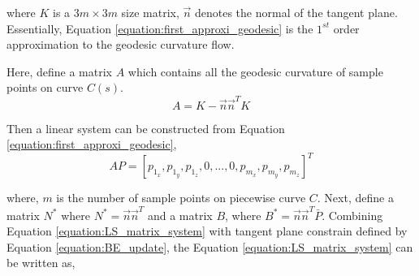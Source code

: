 where $K$ is a ${3m\times 3m}$ size matrix, $\vec{n}$ denotes the normal of the tangent plane. Essentially, Equation \ref{equation:first_approxi_geodesic} is the $1^{st}$ order approximation to the geodesic curvature flow. 

Here, define a matrix $A$ which contains all the geodesic curvature of sample points on curve $C(s)$.
\begin{equation}
A = K-\vec{n}\vec{n}^{T}K 
\end{equation}

Then a linear system can be constructed from Equation \ref{equation:first_approxi_geodesic}, 
\begin{equation}
AP = [p_{1_{x}}, p_{1_{y}}, p_{1_{z}},0, ... ,0,p_{m_{x}},p_{m_{y}},p_{m_{z}}]^{T}
\label{equation:LS_matrix_system}
\end{equation}




where, $m$ is the number of sample points on piecewise curve $C$. Next, define a matrix $N^{*}$ where $N^{*} = \vec{n}\vec{n}^{T}$ and a matrix $B$, where $B^{*}=\vec{n}\vec{n}^{T}\bar{P}$.  Combining Equation \ref{equation:LS_matrix_system} with tangent plane constrain defined by Equation \ref{equation:BE_update}, the Equation \ref{equation:LS_matrix_system} can be written as,

